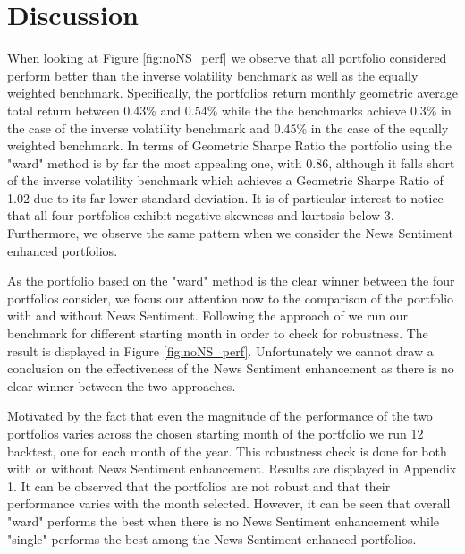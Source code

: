 \section{Discussion}

When looking at Figure \ref{fig:noNS_perf} we observe that all portfolio considered perform better than the inverse volatility benchmark as well as the equally weighted benchmark. Specifically, the portfolios return monthly geometric average total return between 0.43\% and 0.54\% while the the benchmarks achieve 0.3\% in the case of the inverse volatility benchmark and 0.45\% in the case of the equally weighted benchmark. In terms of Geometric Sharpe Ratio the portfolio using the "ward" method is by far the most appealing one, with 0.86, although it falls short of the inverse volatility benchmark which achieves a Geometric Sharpe Ratio of 1.02 due to its far lower standard deviation. It is of particular interest to notice that all four portfolios exhibit negative skewness and kurtosis below 3. Furthermore, we observe the same pattern when we consider the News Sentiment enhanced portfolios.

As the portfolio based on the "ward" method is the clear winner between the four portfolios consider, we focus our attention now to the comparison of the portfolio with and without News Sentiment. Following the approach of \citet{enhPortOpti} we run our benchmark for different starting month in order to check for robustness. The result is displayed in Figure \ref{fig:noNS_perf}. Unfortunately we cannot draw a conclusion on the effectiveness of the News Sentiment enhancement as there is no clear winner between the two approaches. 

Motivated by the fact that even the magnitude of the performance of the two portfolios varies across the chosen starting month of the portfolio we run 12 backtest, one for each month of the year. This robustness check is done for both with or without News Sentiment enhancement. Results are displayed in Appendix 1. It can be observed that the portfolios are not robust and that their performance varies with the month selected. However, it can be seen that overall "ward" performs the best when there is no News Sentiment enhancement while "single" performs the best among the News Sentiment enhanced portfolios.


